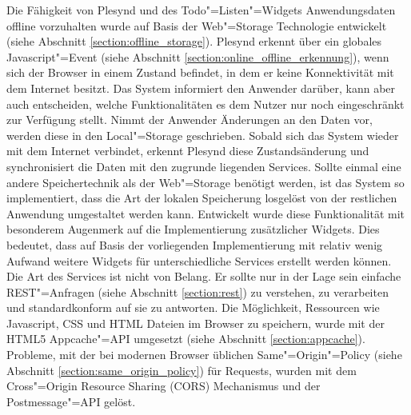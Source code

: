 Die Fähigkeit von Plesynd und des Todo"=Listen"=Widgets Anwendungsdaten offline vorzuhalten wurde auf Basis der Web"=Storage Technologie entwickelt (siehe Abschnitt \ref{section:offline_storage}). Plesynd erkennt über ein globales Javascript"=Event (siehe Abschnitt \ref{section:online_offline_erkennung}), wenn sich der Browser in einem Zustand befindet, in dem er keine Konnektivität mit dem Internet besitzt. Das System informiert den Anwender darüber, kann aber auch entscheiden, welche Funktionalitäten es dem Nutzer nur noch eingeschränkt zur Verfügung stellt. Nimmt der Anwender Änderungen an den Daten vor, werden diese in den Local"=Storage geschrieben. Sobald sich das System wieder mit dem Internet verbindet, erkennt Plesynd diese Zustandsänderung und synchronisiert die Daten mit den zugrunde liegenden Services. Sollte einmal eine andere Speichertechnik als der Web"=Storage benötigt werden, ist das System so implementiert, dass die Art der lokalen Speicherung losgelöst von der restlichen Anwendung umgestaltet werden kann. Entwickelt wurde diese Funktionalität mit besonderem Augenmerk auf die Implementierung zusätzlicher Widgets. Dies bedeutet, dass auf Basis der vorliegenden Implementierung mit relativ wenig Aufwand weitere Widgets für unterschiedliche Services erstellt werden können. Die Art des Services ist nicht von Belang. Er sollte nur in der Lage sein einfache REST"=Anfragen (siehe Abschnitt \ref{section:rest}) zu verstehen, zu verarbeiten und standardkonform auf sie zu antworten. Die Möglichkeit, Ressourcen wie Javascript, CSS und HTML Dateien im Browser zu speichern, wurde mit der HTML5 Appcache"=API umgesetzt (siehe Abschnitt \ref{section:appcache}). Probleme, mit der bei modernen Browser üblichen Same"=Origin"=Policy (siehe Abschnitt \ref{section:same_origin_policy}) für Requests, wurden mit dem Cross"=Origin Resource Sharing (CORS) Mechanismus und der Postmessage"=API gelöst. 

